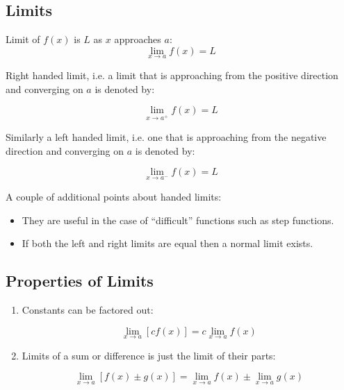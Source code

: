 \documentclass[8pt]{extarticle}
\begin{document}
\begin{multicols}{2}

\section{Limits}
Limit of $f(x)$ is $L$ as $x$ approaches $a$:
\begin{equation}
	\lim_{x \to a} f(x) = L
\end{equation}

Right handed limit, i.e. a limit that is approaching from the positive direction and converging on $a$ is denoted by:

\begin{equation}
	\lim_{x \to a^{+}} f(x) = L 
\end{equation}

Similarly a left handed limit, i.e. one that is approaching from the negative direction and converging on $a$ is denoted by:

\begin{equation}
	\lim_{x \to a^{-}} f(x) = L 
\end{equation}

A couple of additional points about handed limits:
\begin{itemize}
	\item They are useful in the case of ``difficult'' functions such as step functions.
	\item If both the left and right limits are equal then a normal limit exists. 
\end{itemize}

\subsection{Properties of Limits}
\begin{enumerate}
	\item Constants can be factored out: 
	
	\begin{equation}
		\lim_{x \to a} [cf(x)] = c \lim_{x \to a} f(x)
	\end{equation}
	
	\item Limits of a sum or difference is just the limit of their parts:

	\begin{equation}
		\lim_{x \to a} [f(x) \pm g(x)] = \lim_{x \to a} f(x) \pm \lim_{x \to a} g(x)
	\end{equation}
	

\end{enumerate}
\end{multicols}
\end{document}
